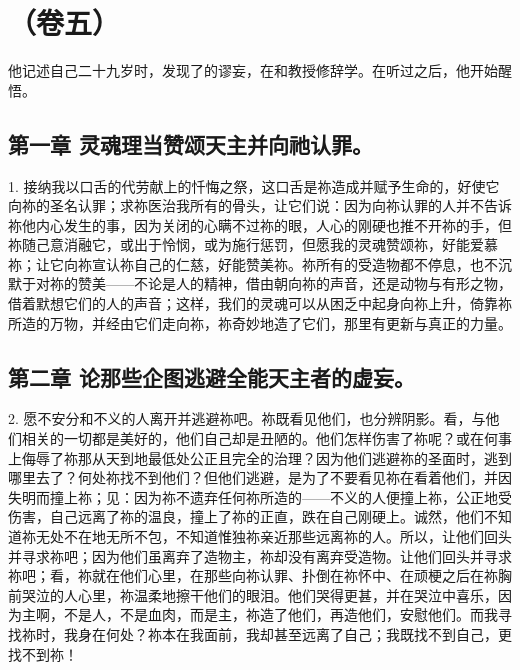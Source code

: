 

\section{（卷五）}

他记述自己二十九岁时，发现了的谬妄，在和教授修辞学。在听过之后，他开始醒悟。\par


\subsection{第一章 灵魂理当赞颂天主并向祂认罪。}

1. 接纳我以口舌的代劳献上的忏悔之祭，这口舌是祢造成并赋予生命的，好使它向祢的圣名认罪；求祢医治我所有的骨头，让它们说：因为向祢认罪的人并不告诉祢他内心发生的事，因为关闭的心瞒不过祢的眼，人心的刚硬也推不开祢的手，但祢随己意消融它，或出于怜悯，或为施行惩罚，但愿我的灵魂赞颂祢，好能爱慕祢；让它向祢宣认祢自己的仁慈，好能赞美祢。祢所有的受造物都不停息，也不沉默于对祢的赞美——不论是人的精神，借由朝向祢的声音，还是动物与有形之物，借着默想它们的人的声音；这样，我们的灵魂可以从困乏中起身向祢上升，倚靠祢所造的万物，并经由它们走向祢，祢奇妙地造了它们，那里有更新与真正的力量。\par


\subsection{第二章 论那些企图逃避全能天主者的虚妄。}

2. 愿不安分和不义的人离开并逃避祢吧。祢既看见他们，也分辨阴影。看，与他们相关的一切都是美好的，他们自己却是丑陋的。他们怎样伤害了祢呢？或在何事上侮辱了祢那从天到地最低处公正且完全的治理？因为他们逃避祢的圣面时，逃到哪里去了？何处祢找不到他们？但他们逃避，是为了不要看见祢在看着他们，并因失明而撞上祢；见：因为祢不遗弃任何祢所造的——不义的人便撞上祢，公正地受伤害，自己远离了祢的温良，撞上了祢的正直，跌在自己刚硬上。诚然，他们不知道祢无处不在地无所不包，不知道惟独祢亲近那些远离祢的人。所以，让他们回头并寻求祢吧；因为他们虽离弃了造物主，祢却没有离弃受造物。让他们回头并寻求祢吧；看，祢就在他们心里，在那些向祢认罪、扑倒在祢怀中、在顽梗之后在祢胸前哭泣的人心里，祢温柔地擦干他们的眼泪。他们哭得更甚，并在哭泣中喜乐，因为主啊，不是人，不是血肉，而是主，祢造了他们，再造他们，安慰他们。而我寻找祢时，我身在何处？祢本在我面前，我却甚至远离了自己；我既找不到自己，更找不到祢！\par

